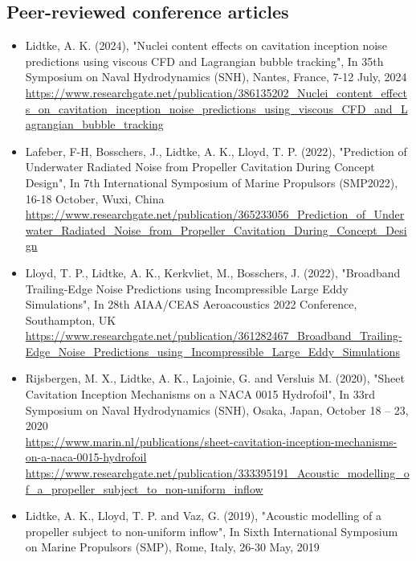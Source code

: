 \documentclass[a4paper,10pt]{article}
\begin{document}
\subsection{Peer-reviewed conference articles}
%
\begin{itemize}
%
\item Lidtke, A. K. (2024),
	"Nuclei content effects on cavitation inception noise predictions using viscous CFD and Lagrangian bubble tracking",
	In 35th Symposium on Naval Hydrodynamics (SNH), Nantes, France, 7-12 July, 2024
	\cite{lidtke_sheet_2024}
	\\ \url{https://www.researchgate.net/publication/386135202_Nuclei_content_effects_on_cavitation_inception_noise_predictions_using_viscous_CFD_and_Lagrangian_bubble_tracking}
%
\item Lafeber, F-H, Bosschers, J., Lidtke, A. K., Lloyd, T. P. (2022),
	"Prediction of Underwater Radiated Noise from Propeller Cavitation During Concept Design",
	In 7th International Symposium of Marine Propulsors (SMP2022), 16-18 October, Wuxi, China
	\cite{lafeber_prediction_2022}
	\\ \url{https://www.researchgate.net/publication/365233056_Prediction_of_Underwater_Radiated_Noise_from_Propeller_Cavitation_During_Concept_Design}
%
\item Lloyd, T. P., Lidtke, A. K., Kerkvliet, M.,  Bosschers, J. (2022),
	"Broadband Trailing-Edge Noise Predictions using Incompressible Large Eddy Simulations",
	In 28th AIAA/CEAS Aeroacoustics 2022 Conference, Southampton, UK
	\cite{lloyd_broadband_2022}
	\\ \url{https://www.researchgate.net/publication/361282467_Broadband_Trailing-Edge_Noise_Predictions_using_Incompressible_Large_Eddy_Simulations}
%
\item Rijsbergen, M. X., Lidtke, A. K., Lajoinie, G. and Versluis M. (2020),
	"Sheet Cavitation Inception Mechanisms on a NACA 0015 Hydrofoil",
	In 33rd Symposium on Naval Hydrodynamics (SNH), Osaka, Japan, October 18 – 23, 2020
	\cite{Rijsbergen2020}
	\\ \url{https://www.marin.nl/publications/sheet-cavitation-inception-mechanisms-on-a-naca-0015-hydrofoil}
	\\ \url{https://www.researchgate.net/publication/333395191\_Acoustic\_modelling\_of\_a\_propeller\_subject\_to\_non-uniform\_inflow}
%
\item Lidtke, A. K., Lloyd, T. P. and Vaz, G. (2019),
	"Acoustic modelling of a propeller subject to non-uniform inflow",
	In Sixth International Symposium on Marine Propulsors (SMP), Rome, Italy, 26-30 May, 2019

\end{itemize}
\end{document}
